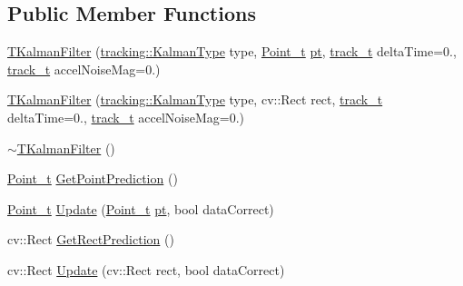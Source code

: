 \subsection*{Public Member Functions}
\begin{DoxyCompactItemize}
\item 
\mbox{\hyperlink{class_t_kalman_filter_a10f577570d5e6f6f6abdff0b816eb6c0}{T\+Kalman\+Filter}} (\mbox{\hyperlink{namespacetracking_a83f2c4d58ea2737f7d6296dce3eb722a}{tracking\+::\+Kalman\+Type}} type, \mbox{\hyperlink{defines_8h_a8c42696da8f098b91374a8e8bb84b430}{Point\+\_\+t}} \mbox{\hyperlink{rings_8cpp_af69bbacaaf68a115b351c5d1e29c3cc8}{pt}}, \mbox{\hyperlink{defines_8h_a7ce9c8817b42ab418e61756f579549ab}{track\+\_\+t}} delta\+Time=0., \mbox{\hyperlink{defines_8h_a7ce9c8817b42ab418e61756f579549ab}{track\+\_\+t}} accel\+Noise\+Mag=0.)
\item 
\mbox{\hyperlink{class_t_kalman_filter_aee7dc25f9fc4e72f627068ab0b56fd75}{T\+Kalman\+Filter}} (\mbox{\hyperlink{namespacetracking_a83f2c4d58ea2737f7d6296dce3eb722a}{tracking\+::\+Kalman\+Type}} type, cv\+::\+Rect rect, \mbox{\hyperlink{defines_8h_a7ce9c8817b42ab418e61756f579549ab}{track\+\_\+t}} delta\+Time=0., \mbox{\hyperlink{defines_8h_a7ce9c8817b42ab418e61756f579549ab}{track\+\_\+t}} accel\+Noise\+Mag=0.)
\item 
\mbox{\hyperlink{class_t_kalman_filter_a19b5f44e8aadad2217ed3f2f370c8608}{$\sim$\+T\+Kalman\+Filter}} ()
\item 
\mbox{\hyperlink{defines_8h_a8c42696da8f098b91374a8e8bb84b430}{Point\+\_\+t}} \mbox{\hyperlink{class_t_kalman_filter_a103fb495ee14ff2be7a29053695ce7d1}{Get\+Point\+Prediction}} ()
\item 
\mbox{\hyperlink{defines_8h_a8c42696da8f098b91374a8e8bb84b430}{Point\+\_\+t}} \mbox{\hyperlink{class_t_kalman_filter_a0c25b9a1a9676956aed0db44ad56696a}{Update}} (\mbox{\hyperlink{defines_8h_a8c42696da8f098b91374a8e8bb84b430}{Point\+\_\+t}} \mbox{\hyperlink{rings_8cpp_af69bbacaaf68a115b351c5d1e29c3cc8}{pt}}, bool data\+Correct)
\item 
cv\+::\+Rect \mbox{\hyperlink{class_t_kalman_filter_af112feed15a064055987a1faedf9673d}{Get\+Rect\+Prediction}} ()
\item 
cv\+::\+Rect \mbox{\hyperlink{class_t_kalman_filter_a8018c71227761d4e7a2d83108eea0220}{Update}} (cv\+::\+Rect rect, bool data\+Correct)
\end{DoxyCompactItemize}
